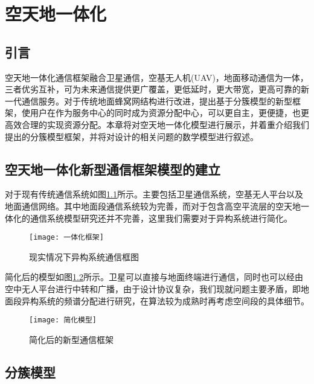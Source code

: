 \chapter{空天地一体化}
\section{引言}
空天地一体化通信框架融合卫星通信，空基无人机(UAV)，地面移动通信为一体，三者优劣互补，可为未来通信提供更广覆盖，更低延时，更大带宽，更高可靠的新一代通信服务。对于传统地面蜂窝网结构进行改进，提出基于分簇模型的新型框架，使用户在作为服务中心的同时成为资源分配中心，可以更自主，更便捷，也更高效合理的实现资源分配。本章将对空天地一体化模型进行展示，并着重介绍我们提出的分簇模型框架，并将对设计的相关问题的数学模型进行叙述。

\section{空天地一体化新型通信框架模型的建立}
对于现有传统通信系统如图\ref{fig:现有框架}所示。主要包括卫星通信系统，空基无人平台以及地面通信网络。其中地面段通信系统较为完善，而对于包含高空平流层的空天地一体化的通信系统模型研究还并不完善，这里我们需要对于异构系统进行简化。
\begin{figure}[h]
	\centering
	\texttt{[image: 一体化框架]}
	\caption{现实情况下异构系统通信框图}
	\label{fig:现有框架}
\end{figure}

简化后的模型如图\ref{fig:简化模型}所示。卫星可以直接与地面终端进行通信，同时也可以经由空中无人平台进行中转和广播，由于设计协议复杂，我们现就问题主要矛盾，即地面段异构系统的频谱分配进行研究，在算法较为成熟时再考虑空间段的具体细节。

\begin{figure}[h]
	\centering
	\texttt{[image: 简化模型]}
	\caption{简化后的新型通信框架}
	\label{fig:简化模型}
\end{figure}

\section{分簇模型}
